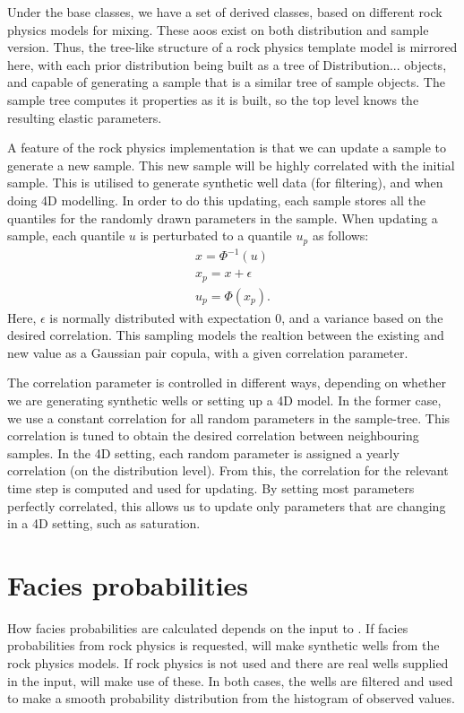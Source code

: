 Under the base classes, we have a set of derived classes, based on different rock physics models for mixing. These aoos exist on both distribution and sample version. Thus, the tree-like structure of a rock physics template model is mirrored here, with each prior distribution being built as a tree of Distribution... objects, and capable of generating a sample that is a similar tree of sample objects. The sample tree computes it properties as it is built, so the top level knows the resulting elastic parameters.

A feature of the rock physics implementation is that we can update a sample to generate a new sample. This new sample will be highly correlated with the initial sample. This is utilised to generate synthetic well data (for filtering), and when doing 4D modelling. In order to do this updating, each sample stores all the quantiles for the randomly drawn parameters in the sample. When updating a sample, each quantile $u$ is perturbated to a quantile $u_p$ as follows:
\begin{eqnarray}
x = \Phi^{-1}(u) \\
x_p = x + \epsilon \\
u_p = \Phi(x_p).
\end{eqnarray}
Here, $\epsilon$ is normally distributed with expectation 0, and a variance based on the desired correlation. This sampling models the realtion between the existing and new value as a Gaussian pair copula, with a given correlation parameter.

The correlation parameter is controlled in different ways, depending on whether we are generating synthetic wells or setting up a 4D model. In the former case, we use a constant correlation for all random parameters in the sample-tree. This correlation is tuned to obtain the desired correlation between neighbouring samples. In the 4D setting, each random parameter is assigned a yearly correlation (on the distribution level). From this, the correlation for the relevant time step is computed and used for updating. By setting most parameters perfectly correlated, this allows us to update only parameters that are changing in a 4D setting, such as saturation.

\section{Facies probabilities}
How facies probabilities are calculated depends on the input to \crava. If facies probabilities from rock physics is requested, \crava will make synthetic wells from the rock physics models. If rock physics is not used and there are real wells supplied in the input, \crava will make use of these. In both cases, the wells are filtered and used to make a smooth probability distribution from the histogram of observed values. 
